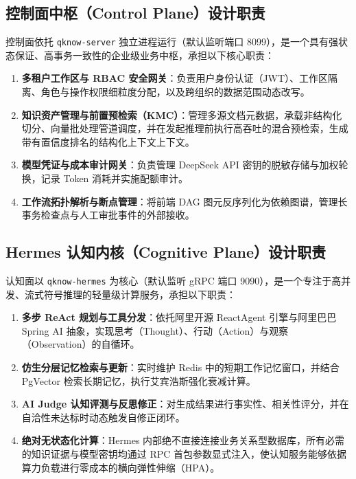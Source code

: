 \subsection{控制面中枢（Control Plane）设计职责}
控制面依托 \texttt{qknow-server} 独立进程运行（默认监听端口 8099），是一个具有强状态保证、高事务一致性的企业级业务中枢，承担以下核心职责：
\begin{enumerate}
    \item \textbf{多租户工作区与 RBAC 安全网关}：负责用户身份认证（JWT）、工作区隔离、角色与操作权限细粒度分配，以及跨组织的数据范围动态改写。
    \item \textbf{知识资产管理与前置预检索（KMC）}：管理多源文档元数据，承载非结构化切分、向量批处理管道调度，并在发起推理前执行高吞吐的混合预检索，生成带有置信度排名的结构化上下文上下文。
    \item \textbf{模型凭证与成本审计网关}：负责管理 DeepSeek API 密钥的脱敏存储与加权轮换，记录 Token 消耗并实施配额审计。
    \item \textbf{工作流拓扑解析与断点管理}：将前端 DAG 图元反序列化为依赖图谱，管理长事务检查点与人工审批事件的外部接收。
\end{enumerate}

\subsection{Hermes 认知内核（Cognitive Plane）设计职责}
认知面以 \texttt{qknow-hermes} 为核心（默认监听 gRPC 端口 9090），是一个专注于高并发、流式符号推理的轻量级计算服务，承担以下职责：
\begin{enumerate}
    \item \textbf{多步 ReAct 规划与工具分发}：依托阿里开源 ReactAgent 引擎与阿里巴巴 Spring AI 抽象，实现思考（Thought）、行动（Action）与观察（Observation）的自循环。
    \item \textbf{仿生分层记忆检索与更新}：实时维护 Redis 中的短期工作记忆窗口，并结合 PgVector 检索长期记忆，执行艾宾浩斯强化衰减计算。
    \item \textbf{AI Judge 认知评测与反思修正}：对生成结果进行事实性、相关性评分，并在自洽性未达标时动态触发自修正闭环。
    \item \textbf{绝对无状态化计算}：Hermes 内部绝不直接连接业务关系型数据库，所有必需的知识证据与模型密钥均通过 RPC 首包参数显式注入，使认知服务能够依据算力负载进行零成本的横向弹性伸缩（HPA）。
\end{enumerate}


